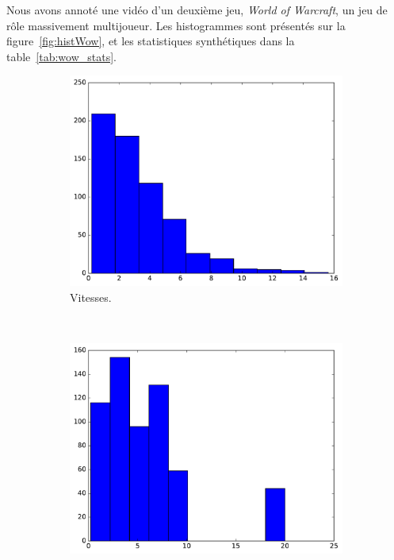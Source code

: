 	Nous avons annoté une vidéo d'un deuxième jeu, \emph{World of Warcraft}, un jeu de rôle massivement multijoueur. Les histogrammes sont présentés sur la figure~\ref{fig:histWow}, et les statistiques synthétiques dans la table~\ref{tab:wow_stats}.

	\begin{figure}[!htbp]
		\begin{subfigure}[t]{\subImgWclicks}
			\centering
			\includegraphics[width=\textwidth]{figures/ch3/wow_filteredSpeed}
			\caption{Vitesses.}
			\label{fig:wow_filteredSpeed}
		\end{subfigure}
		~
		\begin{subfigure}[t]{\subImgWclicks}
			\centering
			\includegraphics[width=\textwidth]{figures/ch3/wow_frequency}

\end{subfigure}
\end{figure}
